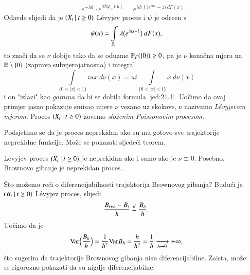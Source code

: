 \begin{pr}
\begin{equation}
\begin{aligned}
            &= e^{-\lambda h} \cdot e^{\lambda h \varphi_F (u)} = e^{\lambda h \int \big( e^{i u x} - 1 \big) \: d F (x)}.
        \end{aligned}
    \end{equation}
    Odavde slijedi da je $({X_t} \: | \: {t \geq 0})$ L\' evyjev proces i $\psi$ je odre\dj en s
    \begin{equation}    \label{jed:21.13}
        \psi (u) = \int\limits_{\mathbb{R}} \lambda \big( e^{i u x - 1} \big) \: d F (x),
    \end{equation}
    to zna\v ci da se $\nu$ dobije tako da se oduzme $\mathbb{P}_F (\{0\}) \geq 0$, pa je $\nu$ kona\v cna mjera na $\mathbb{R} \setminus \{0\}$ (zapravo subvjerojatnosna) i integral
    \begin{equation*}
        \int\limits_{\{ 0 < |x| < 1 \}} i u x \: d \nu (x) = u i \int\limits_{\{ 0 < |x| < 1 \}} x \: d \nu (x)
    \end{equation*}
    i on "izlazi" kao $gamma$ da bi se dobila formula \eqref{jed:21.1}.
    Uo\v cimo da ovaj primjer jasno pokazuje smisao mjere $\nu$ vezano uz skokove, $\nu$ nazivamo \emph{L\' evyjevom mjerom}.
    Proces $({X_t} \: | \: {t \geq 0})$ zovemo \emph{slo\v zenim Poissonovim procesom}.
\end{pr}

Podsjetimo se da je proces neprekidan ako su mu gotovo sve trajektorije neprekidne funkcije.
Mo\v ze se pokazati sljede\' ci teorem.

\begin{tm}  \label{tm:21.14}
    L\' evyjev proces $({X_t} \: | \: {t \geq 0})$ je neprekidan ako i samo ako je $\nu \equiv 0$.
    Posebno, Brownovo gibanje je neprekidan proces.
\end{tm}

\begin{nap} \label{nap:21.15}
    \v Sto mo\v zemo re\' ci o diferencijabilnosti trajektorija Brownovog gibanja?
    Budu\' ci je $({B_t} \: | \: {t \geq 0})$ L\' evyjev proces, slijedi
    \begin{equation*}
        \frac{B_{t + h} - B_t}{h} \overset{d}{=} \frac{B_h}{h}.
    \end{equation*}
    Uo\v cimo da je
    \begin{equation*}
        \mathrm{Var} \Big( \frac{B_h}{h} \Big) = \frac{1}{h^2} \mathrm{Var} B_h = \frac{h}{h^2} = \frac{1}{h} \xrightarrow[h \to 0]{} +\infty,
    \end{equation*}
    \v sto sugerira da trajektorije Brownovog gibanja nisu diferencijabilne.
    Zaista, mo\v ze se rigorozno pokazati da su nigdje diferencijabilne.
\end{nap}